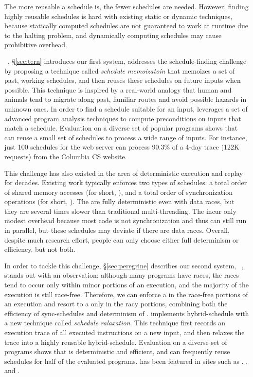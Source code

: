  The more reusable a schedule is, the fewer schedules are needed. However, finding highly reusable schedules is hard with existing static or dynamic techniques, because statically computed schedules are not guaranteed to work at runtime due to the halting problem, and dynamically computing schedules may cause prohibitive overhead.

\tern~\cite{cui:tern:osdi10}, \S\ref{sec:tern} introduces our first \smt system, addresses the schedule-finding challenge by proposing a technique called \emph{schedule memoizatoin} that memoizes a set of past, working schedules, and then 
reuses these schedules on future inputs when possible. This technique is inspired
by a real-world analogy that human and animals tend to migrate along past, familiar routes
and avoid possible hazards in unknown ones. In order to find a schedule 
suitable for an input, \tern leverages a set of advanced program 
analysis techniques to compute preconditions on inputs that match a schedule. 
Evaluation on a diverse set of popular programs shows that \tern can
reuse a small set of schedules to process a wide range of inputs. For 
instance, just 100 schedules for the \apache web server can process 90.3\% of a 4-day 
trace (122K requests) from the Columbia CS website.

 This challenge has also existed in the area of deterministic execution and replay for decades. Existing work typically enforces two types of schedules: a total order of shared memory accesses (for short, \memsched), and a total order of synchronization operations (for 
short, \syncsched). The \memscheds are fully deterministic even with 
data races, but they are several times slower than traditional multi-threading.
The \syncscheds incur only modest overhead because most code is 
not synchronization and thus can still run in parallel, but these schedules may deviate if there are data races. Overall, despite much research effort, people can only choose either full determinism or efficiency, but not both.

In order to tackle this challenge,  \S\ref{sec:peregrine} describes our second \smt system, \peregrine~\cite{peregrine:sosp11}, 
stands out with an observation: although many programs have races, the 
races tend to occur only within minor portions of an execution, and the 
majority of the execution is still race-free. Therefore, we can enforce a \syncscheds
in the race-free portions of an execution and resort to a \memsched only in the racy portions,
combining both the efficiency of sync-schedules and determinism of \memscheds. 
\peregrine implements hybrid-schedule with
a new technique called \emph{schedule ralaxation}. This technique first records an execution 
trace of all executed instructions on a new input, and then relaxes 
the trace into a highly reusable hybrid-schedule. Evaluation on a diverse set of programs shows that 
\peregrine is deterministic and efficient, and can frequently reuse schedules 
for half of the evaluated programs. \peregrine has been featured in sites such 
as \acmtechnews, \tgdaily, and \physorg.

